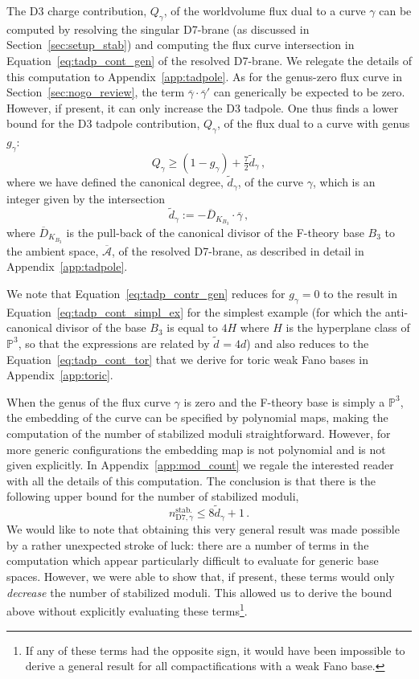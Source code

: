 \documentclass[a4paper,12pt]{article}
\numberwithin{equation}{section}
\newcommand{\mc}{\mathcal}
\newcommand{\mbb}{\mathbb}
\newcommand{\be}{\begin{equation}}
\newcommand{\ee}{\end{equation}}
\newcommand{\fthb}{B_3}				%
\newcommand{\candl}{\overline{D}_{K_{B_3}}}	%
\newcommand{\asl}{\overline{\mc{A}}}	%
\newcommand{\crv}{\gamma}			%
\newcommand{\crvl}{\overline{\gamma}}	%
\newcommand{\degr}[1]{\tilde{d}_{#1}}			%
\newcommand{\flxcont}[1]{Q_{#1}}		%
\newcommand{\stbmod}[1]{n_{\mathrm{D7},{#1}}^\mathrm{stab.}}		%
\begin{document}
\bigskip


The D3 charge contribution, $\flxcont{\crv}$, of the worldvolume flux dual to a curve $\crv$ can be computed by resolving the singular D7-brane (as discussed in Section~\ref{sec:setup_stab}) and computing the flux curve intersection in Equation~\eqref{eq:tadp_cont_gen} of the resolved D7-brane. We relegate the details of this computation to Appendix~\ref{app:tadpole}. As for the genus-zero flux curve in Section~\ref{sec:nogo_review}, the term $\crvl \cdot \crvl'$ can generically be expected to be zero. However, if present, it can only increase the D3 tadpole. One thus finds a lower bound for the D3 tadpole contribution, $\flxcont{\crv}$, of the flux dual to a curve with genus $g_\crv$:
\be
\flxcont{\crv} \geq (1-g_\crv) + \tfrac72 \degr{\crv} \,,
\label{eq:tadp_contr_gen}
\ee
where we have defined the canonical degree, $\degr{\crv}$, of the curve $\crv$, which is an integer given by the intersection
\be
\degr{\crv} := -\candl \cdot \crvl \,,
\ee
where $\candl$ is the pull-back of the canonical divisor of the F-theory base $\fthb$ to the ambient space, $\asl$, of the resolved D7-brane, as described in detail in Appendix~\ref{app:tadpole}.

We note that Equation~\eqref{eq:tadp_contr_gen} reduces for  $g_\crv=0$ to the result in Equation~\eqref{eq:tadp_cont_simpl_ex} for the simplest example (for which the anti-canonical divisor of the base $\fthb$ is equal to $4H$ where $H$ is the hyperplane class of $\mbb{P}^3$, so that the expressions are related by $\degr{} = 4d$) and also reduces to the Equation~\eqref{eq:tadp_cont_tor} that we derive for toric weak Fano bases in Appendix~\ref{app:toric}.

\bigskip

When the genus of the flux curve $\crv$ is zero and the F-theory base is simply a $\mbb{P}^3$, the embedding of the curve can be specified by polynomial maps, making the computation of the number of stabilized moduli straightforward. However, for more generic configurations the embedding map is not polynomial and is not given explicitly. In Appendix~\ref{app:mod_count} we regale the interested reader with all the details of this computation. The conclusion is that there is the following upper bound for the number of stabilized moduli,
% 
\be
\stbmod{\crv}\leq  8\degr{\crv} + 1 \,.
\label{eq:mod_stab_gen}
\ee
%
We would like to note that obtaining this very general result was made possible by a rather unexpected stroke of luck: there are a number of terms in the computation which appear particularly difficult to evaluate for generic base spaces. However, we were able to show that, if present, these terms would only {\it decrease} the number of stabilized moduli. This allowed us to derive the bound above without explicitly evaluating these terms\footnote{If any of these terms had the opposite sign, it would have been impossible to derive a general result for all compactifications with a weak Fano base.}.
\end{document}
